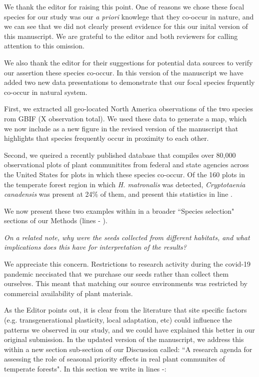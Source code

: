 \documentclass[11pt]{article}
\begin{document}
We thank the editor for raising this point. One of reasons we chose these focal species for our study was our \emph{a priori} knowlege that they co-occur in nature, and we can see that we did not clearly present evidence for this our inital version of this manuscript. We are grateful to the editor and both reviewers for calling attention to this omission.

We also thank the editor for their suggestions for potential data sources to verify our assertion these species co-occur. In this version of the manuscript we have added two new data presentations to demonstrate that our focal species frquently co-occur in natural system. 

First, we extracted all geo-located North America observations of the two species rom GBIF (X observation total). We used these data to generate a map, which we now include as a new figure in the revised version of the manuscript that highlights that species frequently occur in proximity to each other.

Second, we queired a recently published database that compiles over 80,000 observational plots of plant communitites from federal and state agencies across the United States for plots in which these species co-occur. Of the 160 plots in the temperate forest region in which \emph{H. matronalis} was detected, \emph{Cryptotaenia canadensis} was present at 24\% of them, and present this statistics in line .

We now present these two examples within in a broader ``Species selection" sections of our Methods (lines - ).


\emph{On a related note, why were the seeds collected from different habitats, and what implications does this have for interpretation of the results?}

We appreciate this concern. Restrictions to research activity during the covid-19 pandemic neccisated that we purchase our seeds rather than collect them ourselves. This meant that matching our source environments was restricted by commercial availability of plant materials. 

As the Editor points out, it is clear from the literature that site specific factors (e.g.  transgenerational plasticity, local adaptation, etc) could influence the patterns we observed in our study, and we could have explained this better in our original submission. In the updated version of the manuscript, we address this within a new section sub-section of our Discussion called: ``A research agenda for assessing the role of seasonal priority effects in real plant communites of temperate forests". In this section we write in lines -:
\end{document}
